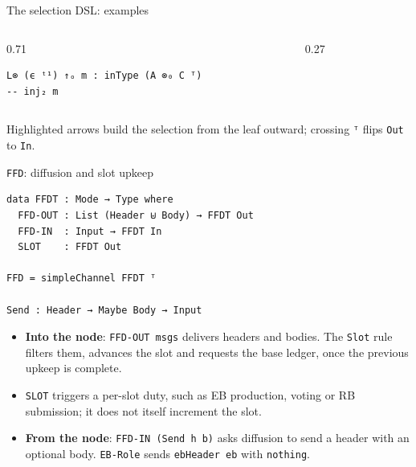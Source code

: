 \documentclass[aspectratio=169,10pt]{beamer}
\newcommand{\agda}[1]{\texttt{#1}}
\begin{document}
\begin{frame}[fragile]{The selection DSL: examples}
\begin{columns}[c]
\begin{column}{0.71\textwidth}
\begin{verbatim}
L⊗ (ϵ ᵗ¹) ↑ₒ m : inType (A ⊗₀ C ᵀ)
-- inj₂ m
\end{verbatim}
    \end{column}
    \begin{column}{0.27\textwidth}
      \centering
    \end{column}
  \end{columns}
  \textcolor{rb}{Highlighted arrows} build the selection from the leaf outward;
  crossing \agda{ᵀ} flips \agda{Out} to \agda{In}.
\end{frame}

\begin{frame}[fragile]{\agda{FFD}: diffusion and slot upkeep}
\begin{verbatim}
data FFDT : Mode → Type where
  FFD-OUT : List (Header ⊎ Body) → FFDT Out
  FFD-IN  : Input → FFDT In
  SLOT    : FFDT Out

FFD = simpleChannel FFDT ᵀ

Send : Header → Maybe Body → Input
\end{verbatim}
  \begin{itemize}\small
    \item \textbf{Into the node}: \agda{FFD-OUT msgs} delivers headers and
          bodies.  The \agda{Slot} rule filters them, advances the slot and
          requests the base ledger, once the previous upkeep is complete.
    \item \agda{SLOT} triggers a per-slot duty, such as EB production,
          voting or RB submission; it does not itself increment the slot.
    \item \textbf{From the node}: \agda{FFD-IN (Send h b)} asks diffusion
          to send a header with an optional body.  \agda{EB-Role} sends
          \agda{ebHeader eb} with \agda{nothing}.
  \end{itemize}
\end{frame}
\end{document}
